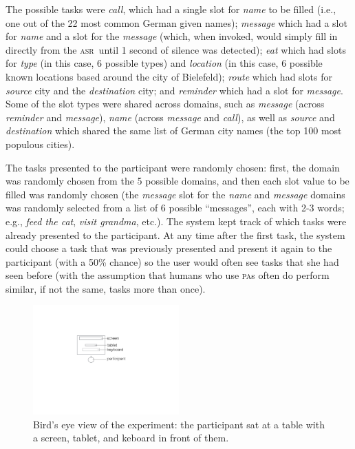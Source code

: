 \documentclass[11pt]{article}
\newcommand{\asr}[0]{\textsc{asr}}
\newcommand{\pa}[0]{\textsc{pa}}
\begin{document}
The possible tasks were \emph{call}, which had a single slot for \emph{name} to be filled (i.e., one out of the 22 most common German given names); \emph{message} which had a slot for \emph{name} and a slot for the \emph{message} (which, when invoked, would simply fill in directly from the \asr\ until 1 second of silence was detected); \emph{eat} which had slots for \emph{type} (in this case, 6 possible types) and \emph{location} (in this case, 6 possible known locations based around the city of Bielefeld); \emph{route} which had slots for \emph{source} city and the \emph{destination} city; and \emph{reminder} which had a slot for \emph{message}. Some of the slot types were shared across domains, such as \emph{message} (across \emph{reminder} and \emph{message}), \emph{name} (across \emph{message} and \emph{call}), as well as \emph{source} and \emph{destination} which shared the same list of German city names (the top 100 most populous cities). 



The tasks presented to the participant were randomly chosen: first, the domain was randomly chosen from the 5 possible domains, and then each slot value to be filled was randomly chosen (the \emph{message} slot for the \emph{name} and \emph{message} domains was randomly selected from a list of 6 possible ``messages'', each with 2-3 words; e.g., \emph{feed the cat}, \emph{visit grandma}, etc.). The system kept track of which tasks were already presented to the participant. At any time after the first task, the system could choose a task that was previously presented and present it again to the participant (with a 50\% chance) so the user would often see tasks that she had seen before (with the assumption that humans who use \pa s often do perform similar, if not the same, tasks more than once). 

\begin{figure}[ht]
  \centering
      \includegraphics[width=0.5\textwidth]{figures/dataview.pdf}	
      \caption{Bird's eye view of the experiment: the participant sat at a table with a screen, tablet, and keboard in front of them. \label{fig:dataview}}
\end{figure}
\end{document}
